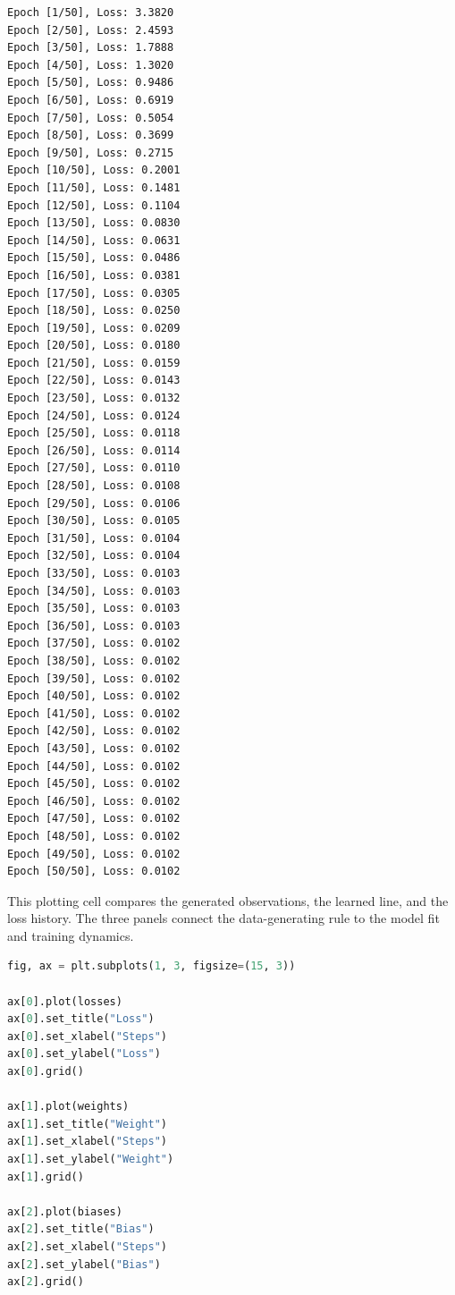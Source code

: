 \documentclass[../labs.tex]{subfiles}
\begin{document}
\begin{lstlisting}[style=terminalOutput]
Epoch [1/50], Loss: 3.3820
Epoch [2/50], Loss: 2.4593
Epoch [3/50], Loss: 1.7888
Epoch [4/50], Loss: 1.3020
Epoch [5/50], Loss: 0.9486
Epoch [6/50], Loss: 0.6919
Epoch [7/50], Loss: 0.5054
Epoch [8/50], Loss: 0.3699
Epoch [9/50], Loss: 0.2715
Epoch [10/50], Loss: 0.2001
Epoch [11/50], Loss: 0.1481
Epoch [12/50], Loss: 0.1104
Epoch [13/50], Loss: 0.0830
Epoch [14/50], Loss: 0.0631
Epoch [15/50], Loss: 0.0486
Epoch [16/50], Loss: 0.0381
Epoch [17/50], Loss: 0.0305
Epoch [18/50], Loss: 0.0250
Epoch [19/50], Loss: 0.0209
Epoch [20/50], Loss: 0.0180
Epoch [21/50], Loss: 0.0159
Epoch [22/50], Loss: 0.0143
Epoch [23/50], Loss: 0.0132
Epoch [24/50], Loss: 0.0124
Epoch [25/50], Loss: 0.0118
Epoch [26/50], Loss: 0.0114
Epoch [27/50], Loss: 0.0110
Epoch [28/50], Loss: 0.0108
Epoch [29/50], Loss: 0.0106
Epoch [30/50], Loss: 0.0105
Epoch [31/50], Loss: 0.0104
Epoch [32/50], Loss: 0.0104
Epoch [33/50], Loss: 0.0103
Epoch [34/50], Loss: 0.0103
Epoch [35/50], Loss: 0.0103
Epoch [36/50], Loss: 0.0103
Epoch [37/50], Loss: 0.0102
Epoch [38/50], Loss: 0.0102
Epoch [39/50], Loss: 0.0102
Epoch [40/50], Loss: 0.0102
Epoch [41/50], Loss: 0.0102
Epoch [42/50], Loss: 0.0102
Epoch [43/50], Loss: 0.0102
Epoch [44/50], Loss: 0.0102
Epoch [45/50], Loss: 0.0102
Epoch [46/50], Loss: 0.0102
Epoch [47/50], Loss: 0.0102
Epoch [48/50], Loss: 0.0102
Epoch [49/50], Loss: 0.0102
Epoch [50/50], Loss: 0.0102
\end{lstlisting}


\noindent This plotting cell compares the generated observations, the learned line, and the loss history. The three panels connect the data-generating rule to the model fit and training dynamics.\par
\begin{lstlisting}[language=Python,basicstyle=\ttfamily\scriptsize,breaklines=true,breakatwhitespace=false,columns=fullflexible,keepspaces=true,numbers=none]
fig, ax = plt.subplots(1, 3, figsize=(15, 3))

ax[0].plot(losses)
ax[0].set_title("Loss")
ax[0].set_xlabel("Steps")
ax[0].set_ylabel("Loss")
ax[0].grid()

ax[1].plot(weights)
ax[1].set_title("Weight")
ax[1].set_xlabel("Steps")
ax[1].set_ylabel("Weight")
ax[1].grid()

ax[2].plot(biases)
ax[2].set_title("Bias")
ax[2].set_xlabel("Steps")
ax[2].set_ylabel("Bias")
ax[2].grid()
\end{lstlisting}
\end{document}
